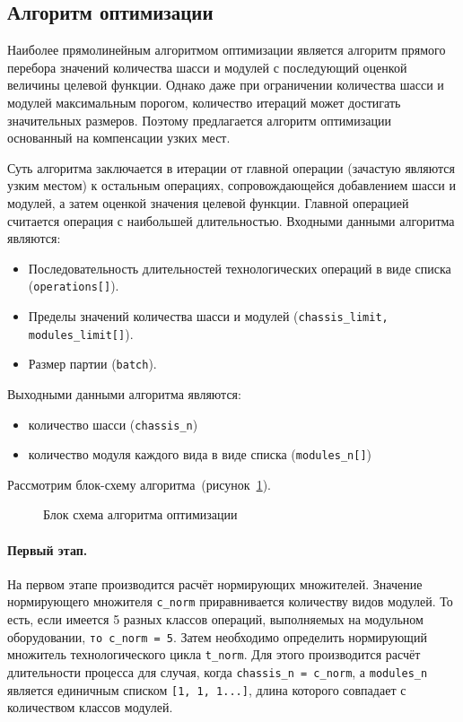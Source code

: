 \subsection{Алгоритм оптимизации}

Наиболее прямолинейным алгоритмом оптимизации является алгоритм прямого перебора значений количества шасси и модулей с последующий оценкой величины целевой функции. Однако даже при ограничении количества шасси и модулей максимальным порогом, количество итераций может достигать значительных размеров. Поэтому предлагается алгоритм оптимизации основанный на компенсации узких мест.

Суть алгоритма заключается в итерации от главной операции (зачастую являются узким местом) к остальным операциях, сопровождающейся добавлением шасси и модулей, а затем оценкой значения целевой функции. Главной операцией считается операция с наибольшей длительностью. Входными данными алгоритма являются:

\begin{itemize}
	\item Последовательность длительностей технологических операций в виде списка (\texttt{operations[]}).
	\item Пределы значений количества шасси и модулей (\texttt{chassis\_limit, modules\_limit[]}).
	\item Размер партии (\texttt{batch}).
\end{itemize}


Выходными данными алгоритма являются:
\begin{itemize}
	\item количество шасси (\texttt{chassis\_n})
	\item количество модуля каждого вида в виде списка (\texttt{modules\_n[]})
\end{itemize}


Рассмотрим блок-схему алгоритма~(рисунок~\cref{fig:algo-1}).

\begin{figure}[!b]
	\caption{Блок схема алгоритма оптимизации}\label{fig:algo-1}
\end{figure}


\paragraph{Первый этап.} На первом этапе производится расчёт нормирующих множителей. Значение нормирующего множителя \texttt{c\_norm} приравнивается  количеству видов модулей. То есть, если имеется 5 разных классов операций, выполняемых на модульном оборудовании, \texttt{то c\_norm = 5}. Затем необходимо определить нормирующий множитель технологического цикла \texttt{t\_norm}. Для этого производится расчёт длительности процесса для случая, когда \texttt{chassis\_n = c\_norm}, а \texttt{modules\_n} является единичным списком \texttt{[1, 1, 1...]}, длина которого совпадает с количеством классов модулей.  
 
